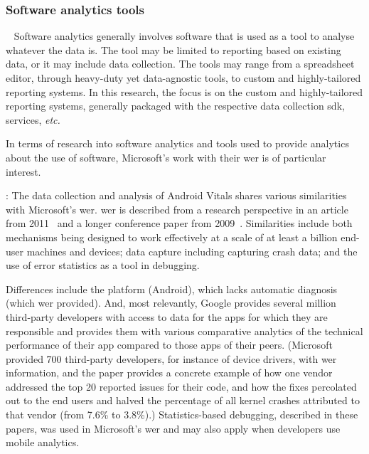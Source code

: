 \subsubsection{Software analytics tools}~\label{rw-software-analytics-tools-research}
Software analytics generally involves software that is used as a tool to analyse whatever the data is. The tool may be limited to reporting based on existing data, or it may include data collection. The tools may range from a spreadsheet editor, through heavy-duty yet data-agnostic tools, to custom and highly-tailored reporting systems. In this research, the focus is on the custom and highly-tailored reporting systems, generally packaged with the respective data collection \Gls{sdk}, services, \emph{etc.}  

In terms of research into software analytics and tools used to provide analytics about the use of software, Microsoft's work with their \Gls{wer} is of particular interest. 

: 
The data collection and analysis of Android Vitals shares various similarities with Microsoft's \acrfull{wer}. \Gls{wer} is described from a research perspective in an article from 2011~ and a longer conference paper from 2009~. Similarities include both mechanisms being designed to work effectively at a scale of at least a billion end-user machines and devices; data capture including capturing crash data; and the use of error statistics as a tool in debugging.

Differences include the platform (Android), which lacks automatic diagnosis (which \Gls{wer} provided). And, most relevantly, Google provides several million third-party developers with access to data for the apps for which they are responsible and provides them with various comparative analytics of the technical performance of their app compared to those apps of their peers. (Microsoft provided 700 third-party developers, for instance of device drivers, with \Gls{wer} information, and the paper provides a concrete example of how one vendor addressed the top 20 reported issues for their code, and how the fixes percolated out to the end users and halved the percentage of all kernel crashes attributed to that vendor (from 7.6\% to 3.8\%).) Statistics-based debugging, described in these papers, was used in Microsoft's \Gls{wer} and may also apply when developers use mobile analytics.

